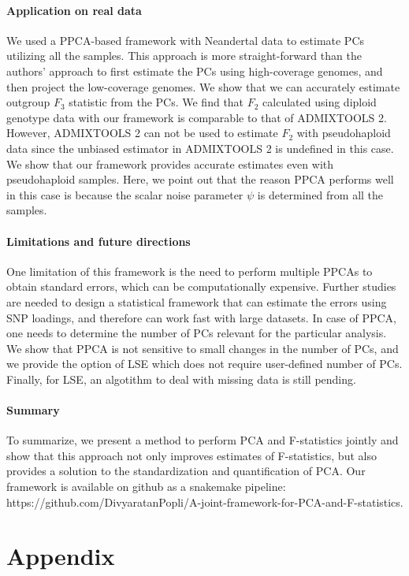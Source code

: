 \documentclass[12pt, letterpaper]{article}
\begin{document}
\paragraph{Application on real data}
We used a PPCA-based framework with Neandertal data to estimate PCs utilizing all the samples. This approach is more straight-forward than the authors' approach to first estimate the PCs using high-coverage genomes, and then project the low-coverage genomes. We show that we can accurately estimate outgroup $F_3$ statistic from the PCs. We find that $F_2$ calculated using diploid genotype data with our framework is comparable to that of ADMIXTOOLS 2. However, ADMIXTOOLS 2 can not be used to estimate $F_2$ with pseudohaploid data since the unbiased estimator in ADMIXTOOLS 2 is undefined in this case. We show that our framework provides accurate estimates even with pseudohaploid samples. Here, we point out that the reason PPCA performs well in this case is because the scalar noise parameter $\psi$ is determined from all the samples.

\paragraph{Limitations and future directions}
One limitation of this framework is the need to perform multiple PPCAs to obtain standard errors, which can be computationally expensive. Further studies are needed to design a statistical framework that can estimate the errors using SNP loadings, and therefore can work fast with large datasets. In case of PPCA, one needs to determine the number of PCs relevant for the particular analysis. We show that PPCA is not sensitive to small changes in the number of PCs, and we provide the option of LSE which does not require user-defined number of PCs. Finally, for LSE, an algotithm to deal with missing data is still pending. 

\paragraph{Summary}
To summarize, we present a method to perform PCA and F-statistics jointly and show that this approach not only improves estimates of F-statistics, but also provides a solution to the standardization and quantification of PCA. Our framework is available on github as a snakemake pipeline: https://github.com/DivyaratanPopli/A-joint-framework-for-PCA-and-F-statistics.


\section{Appendix}
\end{document}
